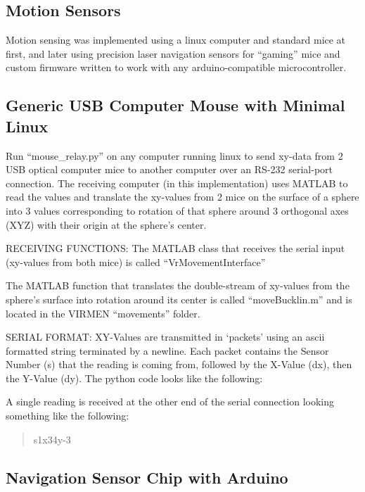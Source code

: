 \subsection{Motion Sensors}\label{sec:motion-sensors}

Motion sensing was implemented using a linux computer and standard mice at first, and later using precision laser navigation sensors for ``gaming'' mice and custom firmware written to work with any arduino-compatible microcontroller.

\subsection{Generic USB Computer Mouse with Minimal Linux}\label{sec:generic-usb-computer-mouse-with-minimal-linux}

Run ``mouse\_relay.py'' on any computer running linux to send xy-data from 2 USB optical computer mice to another computer over an RS-232 serial-port connection.
The receiving computer (in this implementation) uses MATLAB to read the values and translate the xy-values from 2 mice on the surface of a sphere into 3 values corresponding to rotation of that sphere around 3 orthogonal axes (XYZ) with their origin at the sphere's center.

RECEIVING FUNCTIONS: The MATLAB class that receives the serial input (xy-values from both mice) is called ``VrMovementInterface''

The MATLAB function that translates the double-stream of xy-values from the sphere's surface into rotation around its center is called ``moveBucklin.m'' and is located in the VIRMEN ``movements'' folder.

SERIAL FORMAT: XY-Values are transmitted in `packets' using an ascii formatted string terminated by a newline.
Each packet contains the Sensor Number (s) that the reading is coming from, followed by the X-Value (dx), then the Y-Value (dy).
The python code looks like the following:

A single reading is received at the other end of the serial connection looking something like the following:

\begin{quote}
	s1x34y-3
\end{quote}

\subsection{Navigation Sensor Chip with Arduino}\label{sec:navigation-sensor-chip-with-arduino}

